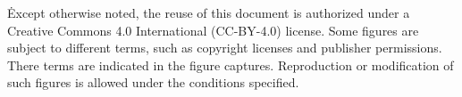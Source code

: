 {%
  \copyrighttext%
  {\copyrightstring\. Except otherwise noted, the reuse of this
    document is authorized under a Creative Commons 4.0 International
  (CC-BY-4.0) license.}%
  {%
    \copyrightstring
    \doclicenseThis
    \blockpar
    Some figures are subject to different terms, such as copyright
    licenses and publisher permissions. There terms are indicated in
    the figure captures. Reproduction or modification of such figures
    is allowed under the conditions specified.
  }
}
